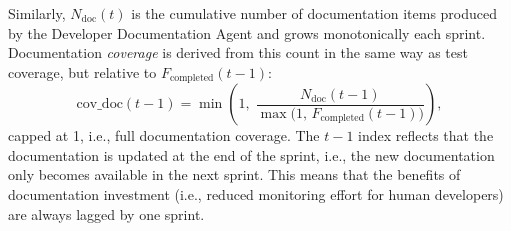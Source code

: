\documentclass[smallextended]{svjour3}       %
\begin{document}
Similarly, $N_\mathrm{doc}(t)$ is the cumulative number of documentation items produced by
the Developer Documentation Agent and grows monotonically each sprint.
Documentation \emph{coverage} is derived from this count in the same way as test coverage,
but relative to $F_\mathrm{completed}(t-1)$:
\begin{equation}
  \mathrm{cov\_doc}(t-1) = \min\!\left(1,\;
    \frac{N_\mathrm{doc}(t-1)}{\max\!\bigl(1,\,F_\mathrm{completed}(t-1)\bigr)}\right),
  \label{eq:doc_cov}
\end{equation}
capped at 1, i.e., full documentation coverage.
The $t-1$ index reflects that the documentation is updated at the end of the sprint, i.e., the new documentation only becomes available in the next sprint. This means that the benefits of documentation investment (i.e., reduced monitoring effort for human developers) are always lagged by one sprint.
\end{document}
